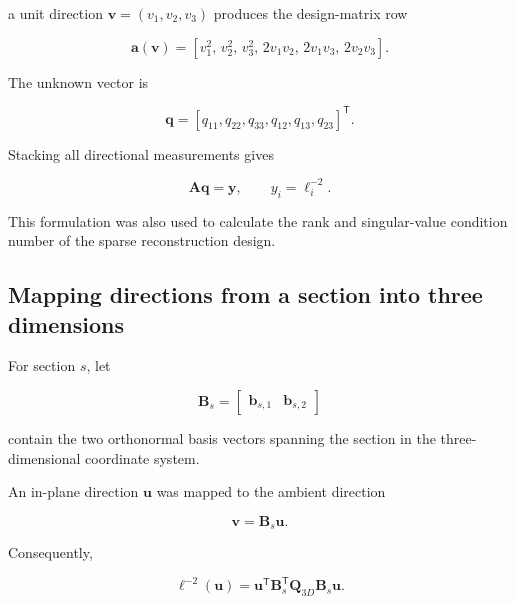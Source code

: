 \documentclass{article}
\begin{document}
a unit direction
$\mathbf{v}=(v_1,v_2,v_3)$ produces the design-matrix row

\begin{equation}
\mathbf{a}(\mathbf{v})
=
\left[
v_1^2,\,
v_2^2,\,
v_3^2,\,
2v_1v_2,\,
2v_1v_3,\,
2v_2v_3
\right].
\label{eq:SI_design_row}
\end{equation}

The unknown vector is

\begin{equation}
\mathbf{q}
=
\left[
q_{11},q_{22},q_{33},q_{12},q_{13},q_{23}
\right]^{\mathsf T}.
\end{equation}

Stacking all directional measurements gives

\begin{equation}
    \mathbf{A}\mathbf{q}=\mathbf{y},
    \qquad
    y_i=\ell_i^{-2}.
    \label{eq:SI_linear_system}
\end{equation}

This formulation was also used to calculate the rank and singular-value
condition number of the sparse reconstruction design.

\subsection{Mapping directions from a section into three dimensions}
\label{sec:SI_section_mapping}

For section $s$, let

\begin{equation}
    \mathbf{B}_s=
    \begin{bmatrix}
    \mathbf{b}_{s,1} & \mathbf{b}_{s,2}
    \end{bmatrix}
\end{equation}

contain the two orthonormal basis vectors spanning the section in the
three-dimensional coordinate system.

An in-plane direction $\mathbf{u}$ was mapped to the ambient direction

\begin{equation}
    \mathbf{v}=\mathbf{B}_s\mathbf{u}.
\end{equation}

Consequently,

\begin{equation}
    \ell^{-2}(\mathbf{u})
    =
    \mathbf{u}^{\mathsf T}
    \mathbf{B}_s^{\mathsf T}
    \mathbf{Q}_{3D}
    \mathbf{B}_s
    \mathbf{u}.
\end{equation}
\end{document}
